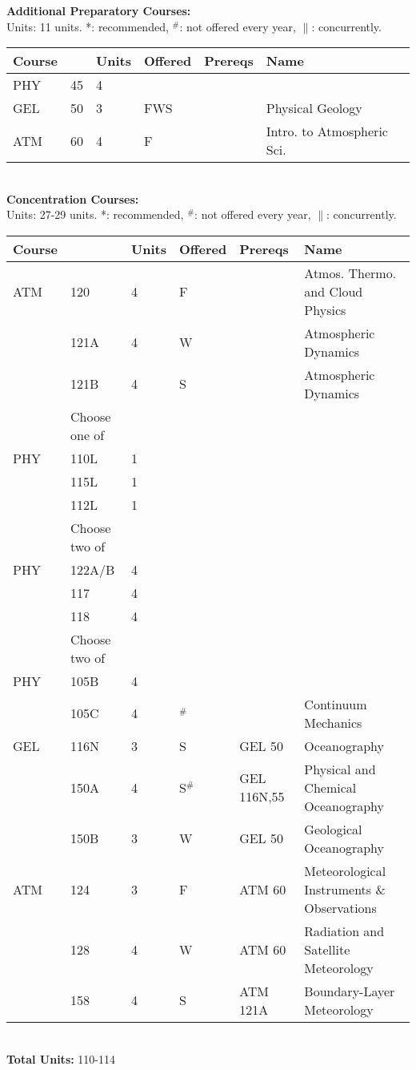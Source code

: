 \documentclass[12pt]{article}
\begin{document}
\newpage
{}
\vskip 0.25cm
\noindent
{\bf Additional Preparatory Courses:  }\\
Units: 11 units. *: recommended, $^\#$: not offered every year, $\parallel$: concurrently.\\
\begin{tabular}{|llllll|}
\hline
Course & & Units & Offered & Prereqs & Name \\
\hline
PHY & 45     & 4 &     & & \\
GEL & 50     & 3 & FWS & & Physical Geology \\
ATM & 60     & 4 & F   & & Intro. to Atmospheric Sci. \\
\hline
\end{tabular}\\
\vskip 0.25cm
\noindent
{\bf Concentration Courses:  }\\
Units:  27-29 units. *: recommended, $^\#$: not offered every year, $\parallel$: concurrently.\\
\begin{tabular}{|llllll|}
\hline
Course & & Units & Offered & Prereqs & Name \\
\hline
ATM & 120    & 4 & F   & & Atmos. Thermo. and Cloud Physics \\
    & 121A   & 4 & W   & & Atmospheric Dynamics \\
    & 121B   & 4 & S   & & Atmospheric Dynamics \\
\hline
\hline
    & Choose one of & & & & \\
\hline
PHY & 110L   & 1 & & & \\
    & 115L   & 1 & & & \\
    & 112L   & 1 & & & \\
\hline
\hline
    & Choose two of & & & & \\
\hline
PHY & 122A/B & 4 & & & \\
    & 117   & 4 & & & \\
    & 118   & 4 & & & \\
\hline
\hline
    & Choose two of & & & & \\
\hline
PHY  & 105B   & 4 & & & \\
     & 105C   & 4 & $^\#$  &             & Continuum Mechanics\\
GEL  & 116N   & 3 & S  & GEL 50      & Oceanography\\
     & 150A   & 4 & S$^\#$ & GEL 116N,55 & Physical and Chemical Oceanography\\
     & 150B   & 3 & W  & GEL 50      & Geological Oceanography\\
ATM  & 124    & 3 & F  & ATM 60      & Meteorological Instruments \& Observations \\
     & 128    & 4 & W  & ATM 60      & Radiation and Satellite Meteorology \\
     & 158    & 4 & S  & ATM 121A    & Boundary-Layer Meteorology \\
\hline
\end{tabular}\\
\vskip 0.25cm
\noindent
{\bf Total Units:} 110-114 \\
\end{document}
